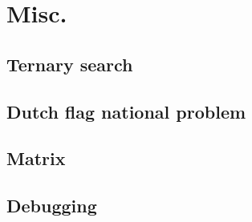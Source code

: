 \section{Misc.}

\subsection{Ternary search}

\subsection{Dutch flag national problem}

\subsection{Matrix}


\subsection{Debugging}

